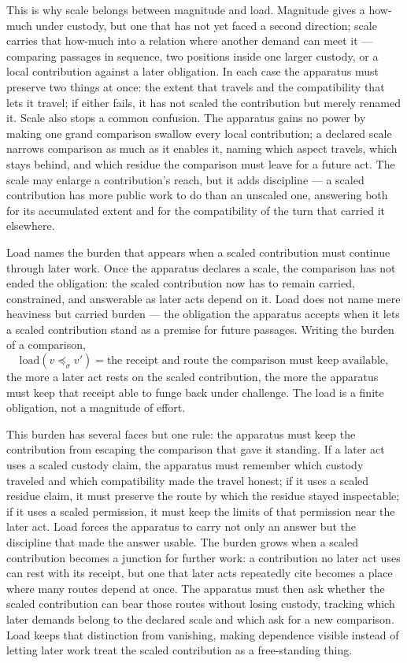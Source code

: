 This is why scale belongs between magnitude and load. Magnitude gives a how-much under custody, but one that has not yet faced a second direction; scale carries that how-much into a relation where another demand can meet it --- comparing passages in sequence, two positions inside one larger custody, or a local contribution against a later obligation. In each case the apparatus must preserve two things at once: the extent that travels and the compatibility that lets it travel; if either fails, it has not scaled the contribution but merely renamed it. Scale also stops a common confusion. The apparatus gains no power by making one grand comparison swallow every local contribution; a declared scale narrows comparison as much as it enables it, naming which aspect travels, which stays behind, and which residue the comparison must leave for a future act. The scale may enlarge a contribution's reach, but it adds discipline --- a scaled contribution has more public work to do than an unscaled one, answering both for its accumulated extent and for the compatibility of the turn that carried it elsewhere.

Load names the burden that appears when a scaled contribution must continue through later work. Once the apparatus declares a scale, the comparison has not ended the obligation: the scaled contribution now has to remain carried, constrained, and answerable as later acts depend on it. Load does not name mere heaviness but carried burden --- the obligation the apparatus accepts when it lets a scaled contribution stand as a premise for future passages. Writing the burden of a comparison,
\[ \mathrm{load}(v \preceq_{\sigma} v') = \text{the receipt and route the comparison must keep available}, \]
the more a later act rests on the scaled contribution, the more the apparatus must keep that receipt able to funge back under challenge. The load is a finite obligation, not a magnitude of effort.

This burden has several faces but one rule: the apparatus must keep the contribution from escaping the comparison that gave it standing. If a later act uses a scaled custody claim, the apparatus must remember which custody traveled and which compatibility made the travel honest; if it uses a scaled residue claim, it must preserve the route by which the residue stayed inspectable; if it uses a scaled permission, it must keep the limits of that permission near the later act. Load forces the apparatus to carry not only an answer but the discipline that made the answer usable. The burden grows when a scaled contribution becomes a junction for further work: a contribution no later act uses can rest with its receipt, but one that later acts repeatedly cite becomes a place where many routes depend at once. The apparatus must then ask whether the scaled contribution can bear those routes without losing custody, tracking which later demands belong to the declared scale and which ask for a new comparison. Load keeps that distinction from vanishing, making dependence visible instead of letting later work treat the scaled contribution as a free-standing thing.

